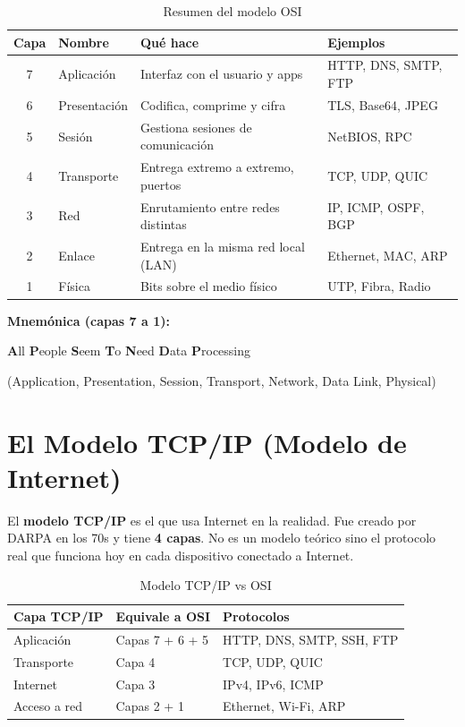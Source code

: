 \begin{table}[h!]
\centering
\renewcommand{\arraystretch}{1.3}
\begin{tabular}{clll}
\toprule
\textbf{Capa} & \textbf{Nombre} & \textbf{Qué hace} & \textbf{Ejemplos} \\
\midrule
7 & Aplicación   & Interfaz con el usuario y apps       & HTTP, DNS, SMTP, FTP \\
6 & Presentación & Codifica, comprime y cifra           & TLS, Base64, JPEG \\
5 & Sesión       & Gestiona sesiones de comunicación    & NetBIOS, RPC \\
4 & Transporte   & Entrega extremo a extremo, puertos   & TCP, UDP, QUIC \\
3 & Red          & Enrutamiento entre redes distintas   & IP, ICMP, OSPF, BGP \\
2 & Enlace       & Entrega en la misma red local (LAN)  & Ethernet, MAC, ARP \\
1 & Física       & Bits sobre el medio físico           & UTP, Fibra, Radio \\
\bottomrule
\end{tabular}
\caption{Resumen del modelo OSI}
\end{table}

\begin{cuidado}
\textbf{ Mnemónica (capas 7 a 1):}

\textbf{A}ll \textbf{P}eople \textbf{S}eem \textbf{T}o \textbf{N}eed \textbf{D}ata \textbf{P}rocessing

(Application, Presentation, Session, Transport, Network, Data Link, Physical)
\end{cuidado}

\section{ El Modelo TCP/IP (Modelo de Internet)}

\begin{concepto}
El \textbf{modelo TCP/IP} es el que usa Internet en la realidad. Fue creado
por DARPA en los 70s y tiene \textbf{4 capas}. No es un modelo teórico sino
el protocolo real que funciona hoy en cada dispositivo conectado a Internet.
\end{concepto}

\begin{table}[h!]
\centering
\renewcommand{\arraystretch}{1.4}
\begin{tabular}{lll}
\toprule
\textbf{Capa TCP/IP} & \textbf{Equivale a OSI} & \textbf{Protocolos} \\
\midrule
Aplicación    & Capas 7 + 6 + 5 & HTTP, DNS, SMTP, SSH, FTP \\
Transporte    & Capa 4          & TCP, UDP, QUIC \\
Internet      & Capa 3          & IPv4, IPv6, ICMP \\
Acceso a red  & Capas 2 + 1     & Ethernet, Wi-Fi, ARP \\
\bottomrule
\end{tabular}
\caption{Modelo TCP/IP vs OSI}
\end{table}

